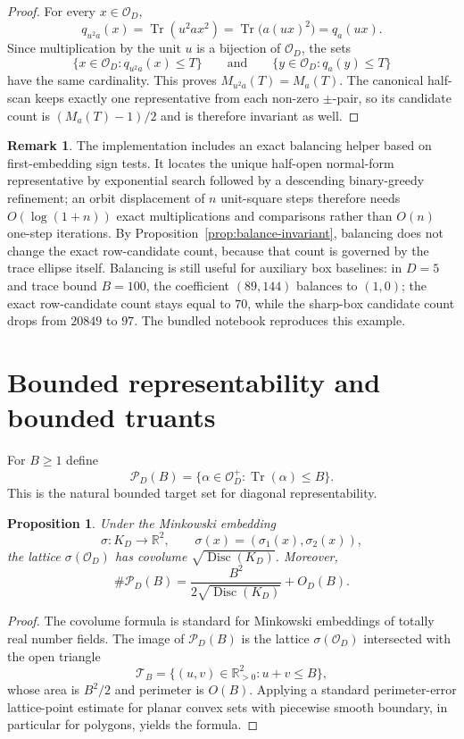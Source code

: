 \documentclass[manuscript]{acmart}
\theoremstyle{plain}
\newtheorem{proposition}[theorem]{Proposition}
\theoremstyle{definition}
\theoremstyle{nonitalicremark}
\newtheorem{remark}[theorem]{Remark}
\newcommand{\R}{\mathbb{R}}
\newcommand{\OO}{\mathcal{O}}
\newcommand{\OD}{\OO_D}
\newcommand{\Tr}{\operatorname{Tr}}
\newcommand{\Disc}{\operatorname{Disc}}
\newcommand{\cP}{\mathcal{P}}
\newcommand{\cT}{\mathcal{T}}
\begin{document}
\begin{proof}
For every $x\in\OD$,
\[
q_{u^2a}(x)=\Tr(u^2ax^2)=\Tr\bigl(a(ux)^2\bigr)=q_a(ux).
\]
Since multiplication by the unit $u$ is a bijection of $\OD$, the sets
\[
\{x\in\OD:q_{u^2a}(x)\le T\}
\qquad\text{and}\qquad
\{y\in\OD:q_a(y)\le T\}
\]
have the same cardinality. This proves $M_{u^2a}(T)=M_a(T)$. The canonical half-scan keeps exactly
one representative from each non-zero $\pm$-pair, so its candidate count is $(M_a(T)-1)/2$ and is
therefore invariant as well.
\end{proof}

\begin{remark}
The implementation includes an exact balancing helper based on first-embedding sign tests. It locates
the unique half-open normal-form representative by exponential search followed by a descending
binary-greedy refinement; an orbit displacement of $n$ unit-square steps therefore needs
$O(\log(1+n))$ exact multiplications and comparisons rather than $O(n)$ one-step iterations. By
Proposition~\ref{prop:balance-invariant}, balancing does not change the exact row-candidate count,
because that count is governed by the trace ellipse itself. Balancing is still useful for auxiliary
box baselines: in $D=5$ and trace bound $B=100$, the coefficient $(89,144)$ balances to $(1,0)$; the
exact row-candidate count stays equal to $70$, while the sharp-box candidate count drops from $20849$
to $97$. The bundled notebook reproduces this example.
\end{remark}

\section{Bounded representability and bounded truants}\label{sec:bounded}

For $B\ge 1$ define
\[
\cP_D(B)=\{\alpha\in\OD^+ : \Tr(\alpha)\le B\}.
\]
This is the natural bounded target set for diagonal representability.

\begin{proposition}\label{prop:triangle-count}
Under the Minkowski embedding
\[
\sigma:K_D\to\R^2,
\qquad
\sigma(x)=(\sigma_1(x),\sigma_2(x)),
\]
the lattice $\sigma(\OD)$ has covolume $\sqrt{\Disc(K_D)}$. Moreover,
\[
\#\cP_D(B)=\frac{B^2}{2\sqrt{\Disc(K_D)}} + O_D(B).
\]
\end{proposition}

\begin{proof}
The covolume formula is standard for Minkowski embeddings of totally real number fields. The image of
$\cP_D(B)$ is the lattice $\sigma(\OD)$ intersected with the open triangle
\[
\cT_B=\{(u,v)\in\R_{>0}^2 : u+v\le B\},
\]
whose area is $B^2/2$ and perimeter is $O(B)$. Applying a standard perimeter-error lattice-point estimate for planar convex sets with piecewise smooth boundary, in particular for polygons, yields the formula.
\end{proof}
\end{document}
